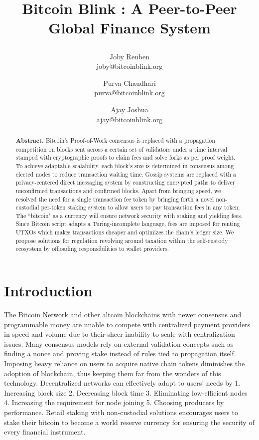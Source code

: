 \documentclass[a4paper, 10pt]{extarticle}
\title{
 \large \textbf{Bitcoin Blink : A Peer-to-Peer Global Finance System}
\author{ \myfontt Joby Reuben \\ \myfontt joby@bitcoinblink.org \and  \myfontt Purva Chaudhari \\ \myfontt purva@bitcoinblink.org \and \myfontt Ajay Joshua \\ \myfontt ajay@bitcoinblink.org}}
\date{}
\begin{document}
\maketitle
\begin{abstract}
\noindent \textbf{Abstract.} Bitcoin's Proof-of-Work consensus is replaced with a propagation competition on blocks sent across a certain set of validators under a time interval stamped with cryptographic proofs to claim fees and solve forks as per proof weight. To achieve adaptable scalability, each block's size is determined in consensus among elected nodes to reduce transaction waiting time. Gossip systems are replaced with a privacy-centered direct messaging system by constructing encrypted paths to deliver unconfirmed transactions and confirmed blocks. Apart from bringing speed, we resolved the need for a single transaction fee token by bringing forth a novel non-custodial per-token staking system to allow users to pay transaction fees in any token. The ``bitcoin" as a currency will ensure network security with staking and yielding fees. Since Bitcoin script adapts a Turing-incomplete language, fees are imposed for renting UTXOs which makes transactions cheaper and optimizes the chain's ledger size. We propose solutions for regulation revolving around taxation within the self-custody ecosystem by offloading responsibilities to wallet providers. 
\end{abstract}
\section{Introduction}
The Bitcoin Network \cite{nakamoto2008bitcoin} and other altcoin blockchains with newer consensus and programmable money are unable to compete with centralized payment providers in speed and volume due to their sheer inability to scale with centralization issues. Many consensus models rely on external validation concepts such as finding a nonce and proving stake instead of rules tied to propagation itself. Imposing heavy reliance on users to acquire native chain tokens diminishes the adoption of blockchain, thus keeping them far from the wonders of this technology. Decentralized networks can effectively adapt to users’ needs by 1. Increasing block size 2. Decreasing block time 3. Eliminating low-efficient nodes 4. Increasing the requirement for node joining 5. Choosing producers by performance. Retail staking with non-custodial solutions encourages users to stake their bitcoin to become a world reserve currency for ensuring the security of every financial instrument.
\end{document}
